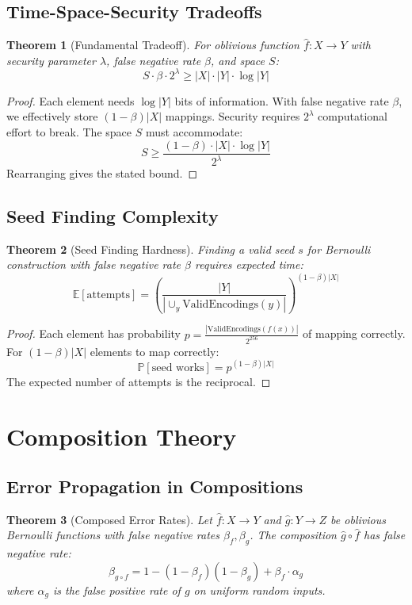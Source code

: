 \documentclass[11pt]{article}
\newtheorem{theorem}{Theorem}[section]
\newcommand{\Obv}[1]{\widehat{#1}}
\newcommand{\ValidEnc}[1]{\text{ValidEncodings}(#1)}
\newcommand{\Prob}[1]{\mathbb{P}[#1]}
\begin{document}
\subsection{Time-Space-Security Tradeoffs}

\begin{theorem}[Fundamental Tradeoff]
For oblivious function $\Obv{f}: X \to Y$ with security parameter $\lambda$, false negative rate $\beta$, and space $S$:
\[
S \cdot \beta \cdot 2^\lambda \geq |X| \cdot |Y| \cdot \log|Y|
\]
\end{theorem}

\begin{proof}
Each element needs $\log|Y|$ bits of information. With false negative rate $\beta$, we effectively store $(1-\beta)|X|$ mappings. Security requires $2^\lambda$ computational effort to break. The space $S$ must accommodate:
\[
S \geq \frac{(1-\beta) \cdot |X| \cdot \log|Y|}{2^\lambda}
\]
Rearranging gives the stated bound.
\end{proof}

\subsection{Seed Finding Complexity}

\begin{theorem}[Seed Finding Hardness]
Finding a valid seed $s$ for Bernoulli construction with false negative rate $\beta$ requires expected time:
\[
\mathbb{E}[\text{attempts}] = \left(\frac{|Y|}{|\cup_y \ValidEnc{y}|}\right)^{(1-\beta)|X|}
\]
\end{theorem}

\begin{proof}
Each element has probability $p = \frac{|\ValidEnc{f(x)}|}{2^{256}}$ of mapping correctly. For $(1-\beta)|X|$ elements to map correctly:
\[
\Prob{\text{seed works}} = p^{(1-\beta)|X|}
\]
The expected number of attempts is the reciprocal.
\end{proof}

\section{Composition Theory}

\subsection{Error Propagation in Compositions}

\begin{theorem}[Composed Error Rates]
Let $\Obv{f}: X \to Y$ and $\Obv{g}: Y \to Z$ be oblivious Bernoulli functions with false negative rates $\beta_f, \beta_g$. The composition $\Obv{g} \circ \Obv{f}$ has false negative rate:
\[
\beta_{g \circ f} = 1 - (1-\beta_f)(1-\beta_g) + \beta_f \cdot \alpha_g
\]
where $\alpha_g$ is the false positive rate of $g$ on uniform random inputs.
\end{theorem}
\end{document}
